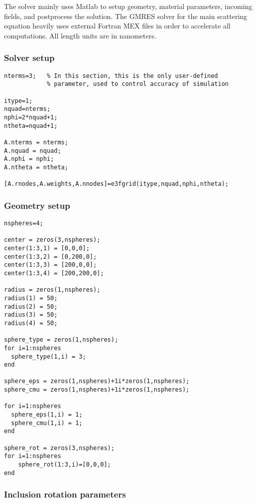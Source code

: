 \documentclass{article}
\begin{document}
The solver mainly uses Matlab to setup geometry, material parameters,
incoming fields, and postprocess the solution. The GMRES solver for
the main scattering equation heavily uses external Fortran MEX files
in order to accelerate all computations. All length units are in nanometers.




\subsubsection{ Solver setup}

\begin{verbatim}
nterms=3;   % In this section, this is the only user-defined
            % parameter, used to control accuracy of simulation

itype=1;
nquad=nterms;
nphi=2*nquad+1;
ntheta=nquad+1;

A.nterms = nterms;
A.nquad = nquad;
A.nphi = nphi;
A.ntheta = ntheta;

[A.rnodes,A.weights,A.nnodes]=e3fgrid(itype,nquad,nphi,ntheta);
\end{verbatim}

\subsubsection{ Geometry setup}

\begin{verbatim}
nspheres=4;
  
center = zeros(3,nspheres);
center(1:3,1) = [0,0,0];
center(1:3,2) = [0,200,0];
center(1:3,3) = [200,0,0];
center(1:3,4) = [200,200,0];
  
radius = zeros(1,nspheres);
radius(1) = 50;
radius(2) = 50;
radius(3) = 50;
radius(4) = 50;

sphere_type = zeros(1,nspheres);
for i=1:nspheres
  sphere_type(1,i) = 3;
end
  
sphere_eps = zeros(1,nspheres)+1i*zeros(1,nspheres);
sphere_cmu = zeros(1,nspheres)+1i*zeros(1,nspheres);
  
for i=1:nspheres
  sphere_eps(1,i) = 1;
  sphere_cmu(1,i) = 1;
end
  
sphere_rot = zeros(3,nspheres);
for i=1:nspheres
    sphere_rot(1:3,i)=[0,0,0];
end
\end{verbatim}

\subsubsection{ Inclusion rotation parameters}
\end{document}
